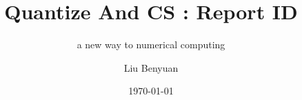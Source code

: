 \documentclass[a4paper,12pt,openany]{article}
\title{Quantize And CS : Report ID}
\subtitle{a new way to numerical computing}
\author{Liu Benyuan}
\date{\today}
\begin{document}
\graphicspath{{fig/}}
\maketitle
\tableofcontents






%
%
\end{document}
